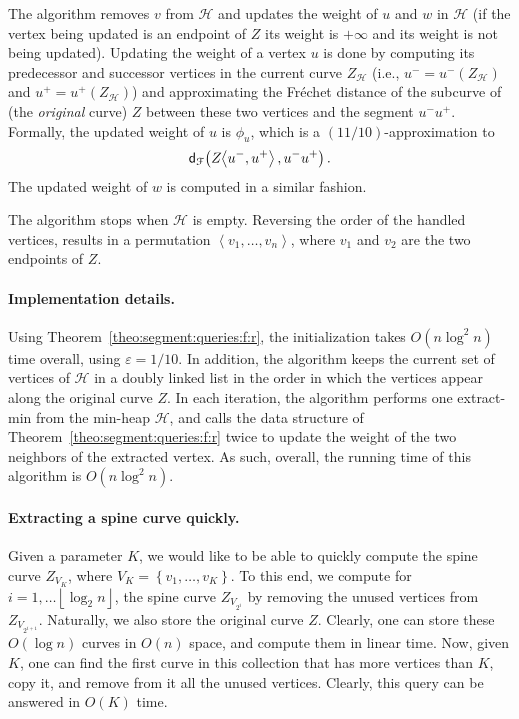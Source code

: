 \documentclass[12pt]{article}
\newcommand{\thmref}[1]{Theorem~\ref{theo:#1}}
\newcommand{\ts}{\hspace{0.6pt}}
\newcommand{\Frechet}{Fr\'{e}c{h}e{}t\xspace}\providecommand{\Arr}{\mathop{\mathrm{\EuScript{A}}}}
\newcommand{\distFr}[2]{\mathsf{d}_{\EuScript{F}}\pth{#1, #2}}
\newcommand{\cZ}{{Z}}
\providecommand{\pth}[2][\!]{#1\left({#2}\right)}
\providecommand{\brc}[1]{\left\{ {#1} \right\}}
\providecommand{\eps}{{\varepsilon}}\renewcommand{\Re}{{\rm I\!\hspace{-0.025em} R}}
\providecommand{\floor}[1]{\left\lfloor {#1} \right\rfloor}
\newcommand{\SC}[3]{{#1}\!\!\ts\ts \left\langle  #2, #3 \right\rangle}
\newcommand{\SpCrv}[2]{{#1}_{#2}}
\newcommand{\permut}[1]{\left\langle {#1} \right\rangle}
\newcommand{\vtxA}{u}
\newcommand{\vtxB}{v}
\newcommand{\vtxC}{w}
\newcommand{\constN}{\ensuremath{({11}/{10})}}
\newcommand{\constEps}{\ensuremath{1/10}}
\newcommand{\weightCX}[1]{\ensuremath{\phi}_{#1}}
\newcommand{\vtx}{\vtxB}
\newcommand{\segX}[2]{{#1}{#2}}
\newcommand{\prevX}[1]{{#1}^{-}}
\newcommand{\nextX}[1]{{#1}^{+}}
\newcommand{\heap}{\mathcal{H}}
\numberwithin{figure}{section}
\numberwithin{equation}{section}
\newcommand{\postdecessor}{successor\xspace}
\begin{document}
The algorithm removes $\vtx$ from $\heap$ and updates the weight of
$\vtxA$ and $\vtxC$ in $\heap$ (if the vertex being updated is an
endpoint of $\cZ$ its weight is $+ \infty$ and its weight is not being
updated). Updating the weight of a vertex $\vtxA$ is done by computing
its predecessor and \postdecessor vertices in the current curve
$\SpCrv{\cZ}{\heap}$ (i.e., $\prevX{\vtxA} =
\prevX{\vtxA}\pth{\SpCrv{\cZ}{\heap}}$ and $\nextX{\vtxA} =
\nextX{\vtxA}\pth{\SpCrv{\cZ}{\heap}}$) and approximating the \Frechet
distance of the subcurve of (the \emph{original} curve) $\cZ$ between
these two vertices and the segment $\segX{\prevX{\vtxA}}{
   \nextX{\vtxA}}$. Formally, the updated weight of $\vtxA$ is
$\weightCX{\vtxA}$, which is a \constN-approximation to
\begin{align*}
    \distFr{\SC{\cZ}{\prevX{\vtxA}}{\nextX{\vtxA}}}
    {\segX{\prevX{\vtxA}}{\nextX{\vtxA}}}.
\end{align*}
The updated weight of $\vtxC$ is computed in a similar fashion.

The algorithm stops when $\heap$ is empty. Reversing the order of the
handled vertices, results in a permutation
$\permut{\vtx_1,\dots,\vtxB_n}$, where $\vtx_1$ and $\vtxB_2$ are the
two endpoints of $\cZ$.








\paragraph{Implementation details.}

Using \thmref{segment:queries:f:r}, the initialization takes $O\pth{ n
   \log^2 n}$ time overall, using $\eps=\constEps$.  In addition, the
algorithm keeps the current set of vertices of $\heap$ in a doubly
linked list in the order in which the vertices appear along the
original curve $\cZ$. In each iteration, the algorithm performs one
extract-min from the min-heap $\heap$, and calls the data structure of
\thmref{segment:queries:f:r} twice to update the weight of the two
neighbors of the extracted vertex. As such, overall, the running time
of this algorithm is $O\pth{ n \log^2 n }$.

\paragraph{Extracting a spine curve quickly.}
Given a parameter $K$, we would like to be able to quickly compute the
spine curve $\SpCrv{\cZ}{V_K}$, where $V_K = \brc{ \vtx_1, \ldots,
   \vtx_K}$. To this end, we compute for $i=1, \ldots \floor{\log_2
   n}$, the spine curve $\SpCrv{\cZ}{V_{2^i}}$ by removing the unused
vertices from $\SpCrv{\cZ}{V_{2^{i+1}}}$.  Naturally, we also store
the original curve $\cZ$. Clearly, one can store these $O( \log n)$
curves in $O(n)$ space, and compute them in linear time. Now, given
$K$, one can find the first curve in this collection that has more
vertices than $K$, copy it, and remove from it all the unused
vertices. Clearly, this query can be answered in $O(K)$ time.
\end{document}
